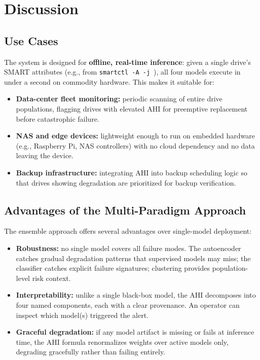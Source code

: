 \documentclass[sigconf,natbib=false, language=english]{acmart}
\begin{document}
\section{Discussion}
\label{sec:discussion}

\subsection{Use Cases}

The system is designed for \textbf{offline, real-time inference}: given a single drive's SMART attributes (e.g., from \texttt{smartctl -A -j}~\cite{smartmontools}), all four models execute in under a second on commodity hardware. This makes it suitable for:

\begin{itemize}
    \item \textbf{Data-center fleet monitoring:} periodic scanning of entire drive populations, flagging drives with elevated AHI for preemptive replacement before catastrophic failure.
    \item \textbf{NAS and edge devices:} lightweight enough to run on embedded hardware (e.g., Raspberry Pi, NAS controllers) with no cloud dependency and no data leaving the device.
    \item \textbf{Backup infrastructure:} integrating AHI into backup scheduling logic so that drives showing degradation are prioritized for backup verification.
\end{itemize}

\subsection{Advantages of the Multi-Paradigm Approach}

The ensemble approach offers several advantages over single-model deployment:

\begin{itemize}
    \item \textbf{Robustness:} no single model covers all failure modes. The autoencoder catches gradual degradation patterns that supervised models may miss; the classifier catches explicit failure signatures; clustering provides population-level risk context.
    \item \textbf{Interpretability:} unlike a single black-box model, the AHI decomposes into four named components, each with a clear provenance. An operator can inspect which model(s) triggered the alert.
    \item \textbf{Graceful degradation:} if any model artifact is missing or fails at inference time, the AHI formula renormalizes weights over active models only, degrading gracefully rather than failing entirely.
\end{itemize}
\end{document}
